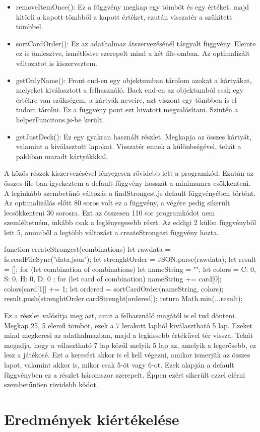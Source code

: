 \begin{itemize}
    \item removeItemOnce(): Ez a függvény megkap egy tömböt és egy értéket, majd kitörli a kapott tömbből a kapott értéket, ezután visszatér a szűkített tömbbel.
    \item sortCardOrder(): Ez az adathalmaz átszervezésénél tárgyalt függvény. Eleinte ez is ömlesztve, ismétlődve szerepelt mind a két file-omban. Az optimalizált változatot is kiszerveztem.
    \item getOnlyName(): Front end-en egy objektumban tárolom azokat a kártyákat, melyeket kiválasztott a felhasználó. Back end-en az objektumból csak egy értékre van szükségem, a kártyák neveire, azt viszont egy tömbben is el tudom tárolni. Ez a függvény pont ezt hivatott megvalósítani. Szintén a helperFuncitons.js-be került.
    \item getJustDeck(): Ez egy gyakran használt részlet. Megkapja az összes kártyát, valamint a kiválasztott lapokat. Visszatér ennek a különbségével, tehát a pakliban maradt kártyákkkal.
\end{itemize}

A közös részek kiszervezésével lényegesen rövidebb lett a programkód. Ezután az összes file-ban igyekeztem a default függvény hosszát a minimumra csökkenteni. A leginkább szembetűnő változás a findStrongest.js default függvényében történt. Az optimalizálás előtt 80 soros volt ez a függvény, a végére pedig sikerült lecsökkenteni 30 sorosra. Ezt az összesen 110 sor programkódot nem szemléltetném, inkább csak a leglényegesebb részt. Az eddigi 2 külön függvényből lett 5, ammiből a legtöbb változást a createStrongest függvény hozta.

\begin{python}
function createStrongest(combinations){
  let rawdata = fs.readFileSync("data.json");
  let strenghtOrder = JSON.parse(rawdata);
  let result =  [];
  for (let combination of combinations) {
    let nameString = "";
    let colors = { C: 0, S: 0, H: 0, D: 0 };
    for (let card of combination) {
      nameString += card[0];
      colors[card[1]] += 1;
    }
    let ordered = sortCardOrder(nameString, colors);
    result.push(strenghtOrder.cardStrenght[ordered]);
  }
  return Math.min(...result);
}
\end{python}

Ez a részlet valósítja meg azt, amit a felhasználó magától is el tud dönteni. Megkap 25, 5 elemű tömböt, ezek a 7 lerakott lapból kiválasztható 5 lap. Ezeket mind megkeresi az adathalmazban, majd a legkissebb értékűvel tér vissza. Tehát megadja, hogy a választható 7 lap közül melyik 5 lap az, amelyik a legerősebb, ez lesz a játékosé. Ezt a keresést akkor is el kell végezni, amikor ismerjük az összes lapot, valamint akkor is, mikor csak 5-öt vagy 6-ot. Ezek alapján a default függvényben ez a részlet háromszor szerepelt. Éppen ezért sikerült ezzel elérni szembetűnően rövidebb kódot.

\section{Eredmények kiértékelése}